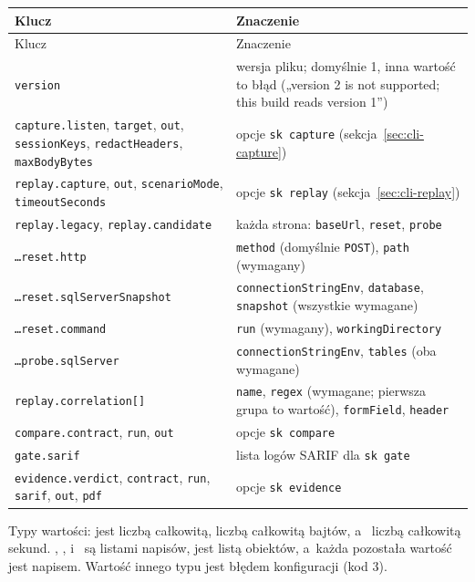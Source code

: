 {\small
\begin{xltabular}{\linewidth}{@{}>{\raggedright\arraybackslash}p{5.2cm} >{\raggedright\arraybackslash}X@{}}
\toprule
Klucz & Znaczenie \\
\midrule
\endfirsthead
\toprule
Klucz & Znaczenie \\
\midrule
\endhead
\bottomrule
\endlastfoot
\texttt{version} & wersja pliku; domyślnie 1, inna wartość to błąd („version 2 is not
supported; this build reads version 1”) \\
\texttt{capture.listen}, \texttt{target}, \texttt{out}, \texttt{sessionKeys},
\texttt{redactHeaders}, \texttt{maxBodyBytes} & opcje \texttt{sk capture}
(sekcja~\ref{sec:cli-capture}) \\
\texttt{replay.capture}, \texttt{out}, \texttt{scenarioMode}, \texttt{timeoutSeconds} & opcje
\texttt{sk replay} (sekcja~\ref{sec:cli-replay}) \\
\texttt{replay.legacy}, \texttt{replay.candidate} & każda strona: \texttt{baseUrl},
\texttt{reset}, \texttt{probe} \\
\texttt{…reset.http} & \texttt{method} (domyślnie \texttt{POST}), \texttt{path} (wymagany) \\
\texttt{…reset.sqlServerSnapshot} & \texttt{connectionStringEnv}, \texttt{database},
\texttt{snapshot} (wszystkie wymagane) \\
\texttt{…reset.command} & \texttt{run} (wymagany), \texttt{workingDirectory} \\
\texttt{…probe.sqlServer} & \texttt{connectionStringEnv}, \texttt{tables} (oba wymagane) \\
\texttt{replay.correlation[]} & \texttt{name}, \texttt{regex} (wymagane; pierwsza grupa to
wartość), \texttt{formField}, \texttt{header} \\
\texttt{compare.contract}, \texttt{run}, \texttt{out} & opcje \texttt{sk compare} \\
\texttt{gate.sarif} & lista logów SARIF dla \texttt{sk gate} \\
\texttt{evidence.verdict}, \texttt{contract}, \texttt{run}, \texttt{sarif}, \texttt{out},
\texttt{pdf} & opcje \texttt{sk evidence} \\
\end{xltabular}
}

Typy wartości:  jest liczbą całkowitą,  liczbą
całkowitą bajtów, a~ liczbą całkowitą sekund.
, ,  i~ są
listami napisów,  jest listą obiektów, a~każda pozostała wartość jest
napisem. Wartość innego typu jest błędem konfiguracji (kod 3).

